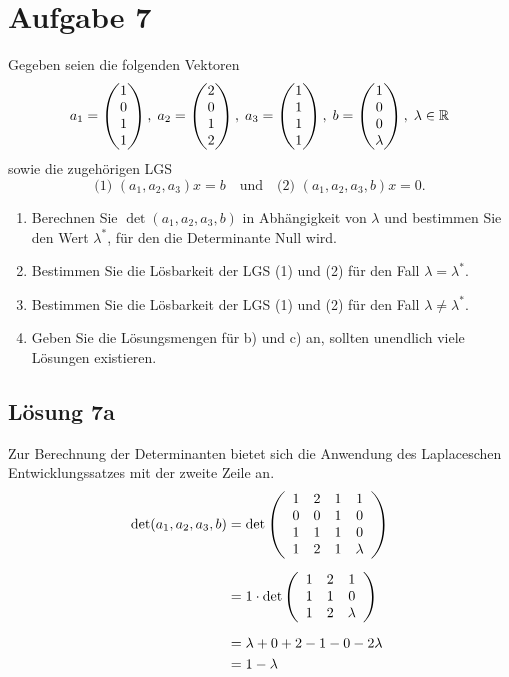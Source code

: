 \documentclass[main.tex]{subfiles}
\begin{document}
\section{Aufgabe 7}
Gegeben seien die folgenden Vektoren
$$
    a_1 = \vektor{1\\0\\1\\1}, \;
    a_2 = \vektor{2\\0\\1\\2}, \;
    a_3 = \vektor{1\\1\\1\\1}, \;
    b   = \vektor{1\\0\\0\\ \lambda}, \;
    \lambda \in \mathbb{R}
$$
sowie die zugehörigen LGS
$$
    \text{(1) } (a_1, a_2, a_3)x = b
    \quad \text{und} \quad
    \text{(2) } (a_1, a_2, a_3, b)x = 0.
$$
\begin{enumerate}
    \item Berechnen Sie $\det (a_1, a_2, a_3, b)$ in Abhängigkeit von $\lambda$ und bestimmen Sie den Wert $\lambda^*$, für den die Determinante Null wird.
    \item Bestimmen Sie die Lösbarkeit der LGS (1) und (2) für den Fall $\lambda = \lambda^*$.
    \item Bestimmen Sie die Lösbarkeit der LGS (1) und (2) für den Fall $\lambda \neq \lambda^*$.
    \item Geben Sie die Lösungsmengen für b) und c) an, sollten unendlich viele Lösungen existieren.
\end{enumerate}




\subsection{Lösung 7a}
Zur Berechnung der Determinanten bietet sich die Anwendung des Laplaceschen Entwicklungssatzes mit der zweite Zeile an.
\begin{align*}
    \det  (a_1, a_2, a_3, b) &= \det \eqmatrix{cccc}{
        1 & 2 & 1 & 1 \\
        0 & 0 & 1 & 0 \\
        1 & 1 & 1 & 0 \\
        1 & 2 & 1 & \lambda \\
    }\\[2mm]
    &= 1 \cdot \det \eqmatrix{ccc}{
        1 & 2 & 1 \\
        1 & 1 & 0 \\
        1 & 2 & \lambda \\
    } \\[2mm]
    &= \lambda + 0 + 2 -1 -0 -2\lambda \\
    &= 1-\lambda
\end{align*}
\end{document}
